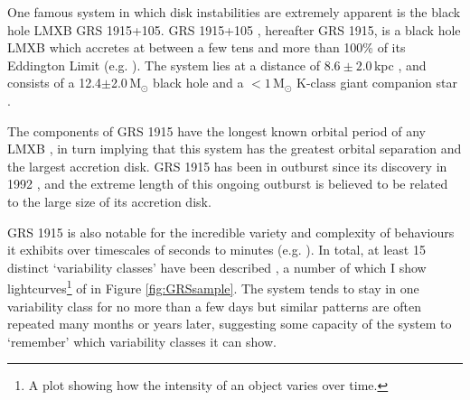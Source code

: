 \par One famous system in which disk instabilities are extremely apparent is the black hole LMXB GRS 1915+105.  GRS 1915+105 \citep{CastroTirado_GRS1915}, hereafter GRS 1915, is a black hole LMXB which accretes at between a few tens and more than 100\% of its Eddington Limit (e.g. \citealp{Vilhu_SupEd,Done_GRS_HighAcc,Fender_DiskJet}).  The system lies at a distance of $8.6\pm2.0$\,kpc \citep{Reid_Parallax}, and consists of a 12.4$\pm$2.0\,M$_\odot$ black hole and a $<1$\,M$_\odot$ K-class giant companion star \citep{Reid_Parallax,Ziolkowski_GRSDonor}.
\par The components of GRS 1915 have the longest known orbital period of any LMXB \citep{Greiner_BigDisk}, in turn implying that this system has the greatest orbital separation and the largest accretion disk.  GRS 1915 has been in outburst since its discovery in 1992 \citep{CastroTirado_GRS1915}, and the extreme length of this ongoing outburst is believed to be related to the large size of its accretion disk. 
\par GRS 1915 is also notable for the incredible variety and complexity of behaviours it exhibits over timescales of seconds to minutes (e.g. \citealp{Yadav_GRSBursts,Belloni_GRS_MI}).  In total, at least 15 distinct `variability classes' have been described \citep{Belloni_GRS_MI,KleinWolt_OmegaClass,Hannikainen_NewClass, Pahari_NewClass}, a number of which I show lightcurves\footnote{A plot showing how the intensity of an object varies over time.} of in Figure \ref{fig:GRSsample}.  The system tends to stay in one variability class for no more than a few days but similar patterns are often repeated many months or years later, suggesting some capacity of the system to `remember' which variability classes it can show.

